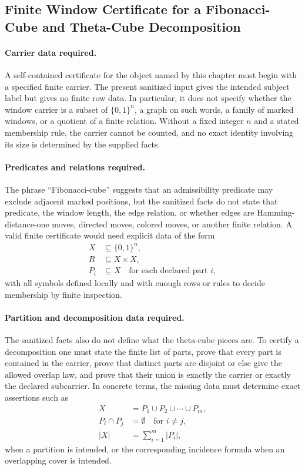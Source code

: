 \subsection{Finite Window Certificate for a Fibonacci-Cube and Theta-Cube Decomposition}\label{sec:window-fibonacci-cube-theta-cube-decomposition-certificate}

\paragraph{Carrier data required.}
A self-contained certificate for the object named by this chapter must begin with a specified finite carrier. The present sanitized input gives the intended subject label but gives no finite row data. In particular, it does not specify whether the window carrier is a subset of $\{0,1\}^n$, a graph on such words, a family of marked windows, or a quotient of a finite relation. Without a fixed integer $n$ and a stated membership rule, the carrier cannot be counted, and no exact identity involving its size is determined by the supplied facts.

\paragraph{Predicates and relations required.}
The phrase ``Fibonacci-cube'' suggests that an admissibility predicate may exclude adjacent marked positions, but the sanitized facts do not state that predicate, the window length, the edge relation, or whether edges are Hamming-distance-one moves, directed moves, colored moves, or another finite relation. A valid finite certificate would need explicit data of the form
$$
\begin{aligned}
X &\subseteq \{0,1\}^n,\\
R &\subseteq X\times X,\\
P_i &\subseteq X\quad \text{for each declared part } i,
\end{aligned}
$$
with all symbols defined locally and with enough rows or rules to decide membership by finite inspection.

\paragraph{Partition and decomposition data required.}
The sanitized facts also do not define what the theta-cube pieces are. To certify a decomposition one must state the finite list of parts, prove that every part is contained in the carrier, prove that distinct parts are disjoint or else give the allowed overlap law, and prove that their union is exactly the carrier or exactly the declared subcarrier. In concrete terms, the missing data must determine exact assertions such as
$$
\begin{aligned}
X &= P_1\cup P_2\cup \cdots \cup P_m,\\
P_i\cap P_j &= \emptyset \quad \text{for } i\neq j,\\
|X| &= \sum_{i=1}^{m}|P_i|,
\end{aligned}
$$
when a partition is intended, or the corresponding incidence formula when an overlapping cover is intended.

